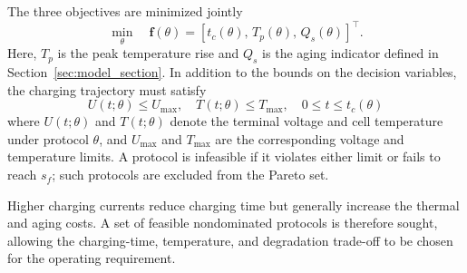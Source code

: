 The three objectives are minimized jointly
\begin{equation}
\min_{\theta}\quad
\boldsymbol{f}(\theta)=[t_c(\theta),\,T_p(\theta),\,Q_s(\theta)]^\top.
\label{eq:cmop}
\end{equation}
Here, $T_p$ is the peak temperature rise and $Q_s$ is the aging indicator
defined in Section~\ref{sec:model_section}. In addition to the bounds on the
decision variables, the charging trajectory must satisfy
\begin{equation}
U(t;\theta)\le U_{\max},\quad
T(t;\theta)\le T_{\max},\quad
0\le t\le t_c(\theta)
\label{eq:operating_constraints}
\end{equation}
where $U(t;\theta)$ and $T(t;\theta)$ denote the terminal voltage and cell
temperature under protocol $\theta$, and $U_{\max}$ and $T_{\max}$ are the
corresponding voltage and temperature limits. A
protocol is infeasible if it violates either limit or fails to reach $s_f$;
such protocols are excluded from the Pareto set.

Higher charging currents reduce charging time but generally increase the
thermal and aging costs. A set of feasible nondominated protocols is
therefore sought, allowing the charging-time, temperature, and degradation trade-off
to be chosen for the operating requirement.
